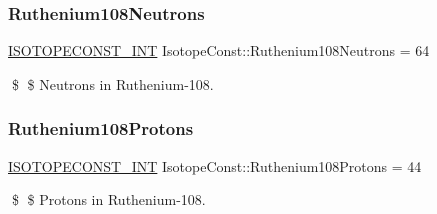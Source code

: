 \subsubsection{\texorpdfstring{Ruthenium108\+Neutrons}{Ruthenium108Neutrons}}
{\footnotesize\ttfamily \mbox{\hyperlink{group___isotope_const-_macros_ga5f18360b3e99483a35c32d789e62621c}{I\+S\+O\+T\+O\+P\+E\+C\+O\+N\+S\+T\+\_\+\+I\+NT}} Isotope\+Const\+::\+Ruthenium108\+Neutrons = 64}

\$ \$ Neutrons in Ruthenium-\/108. \mbox{\label{group___isotope_const-_ruthenium-_ru108_ga013473c7965c717f776d9ab96925c6a6}} 
\subsubsection{\texorpdfstring{Ruthenium108\+Protons}{Ruthenium108Protons}}
{\footnotesize\ttfamily \mbox{\hyperlink{group___isotope_const-_macros_ga5f18360b3e99483a35c32d789e62621c}{I\+S\+O\+T\+O\+P\+E\+C\+O\+N\+S\+T\+\_\+\+I\+NT}} Isotope\+Const\+::\+Ruthenium108\+Protons = 44}

\$ \$ Protons in Ruthenium-\/108. 